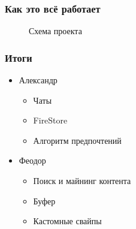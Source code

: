 \documentclass[xetex,mathserif,serif, xcolor=table]{beamer}
\begin{document}
	\begin{frame}
		\frametitle{Как это всё работает}
		\begin{figure}[h]
            \caption{Схема проекта}
            \label{fig:image}
        \end{figure}
	\end{frame}	
	
	\begin{frame}
		\frametitle{Итоги}
		\begin{itemize}
			\item Александр
			    \begin{itemize}
			    	\item Чаты
			    	\item FireStore
			    	\item Алгоритм предпочтений
		        \end{itemize}
			\item Феодор
			    \begin{itemize}
			    	\item Поиск и майнинг контента
			    	\item Буфер  
			    	\item Кастомные свайпы
		        \end{itemize}
		\end{itemize}
	\end{frame}
\end{document}
